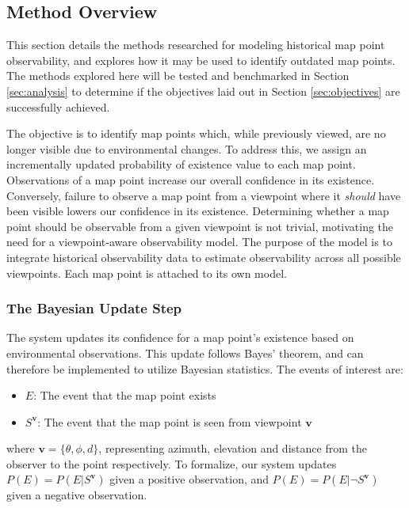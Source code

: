 \subsection{Method Overview}

This section details the methods researched for modeling historical map point observability, and explores how it may be used to identify outdated map points. The methods explored here will be tested and benchmarked in Section \ref{sec:analysis} to determine if the objectives laid out in Section \ref{sec:objectives} are successfully achieved.

The objective is to identify map points which, while previously viewed, are no longer visible due to environmental changes. To address this, we assign an incrementally updated probability of existence value to each map point. Observations of a map point increase our overall confidence in its existence. Conversely, failure to observe a map point from a viewpoint where it \textit{should} have been visible lowers our confidence in its existence. Determining whether a map point should be observable from a given viewpoint is not trivial, motivating the need for a viewpoint-aware observability model. The purpose of the model is to integrate historical observability data to estimate observability across all possible viewpoints. Each map point is attached to its own model.

\subsubsection{The Bayesian Update Step}

The system updates its confidence for a map point's existence based on environmental observations. This update follows Bayes' theorem, and can therefore be implemented to utilize Bayesian statistics. The events of interest are:
\begin{itemize}
    \item $E$: The event that the map point exists
    \item $S^{\boldsymbol{v}}$: The event that the map point is seen from viewpoint $\boldsymbol{v}$
\end{itemize}

where $\boldsymbol{v} = \{\theta,\phi,d\}$, representing azimuth, elevation and distance from the observer to the point respectively. To formalize, our system updates $P(E) = P(E|S^{\boldsymbol{v}})$ given a positive observation, and $P(E) = P(E|\neg S^{\boldsymbol{v}})$ given a negative observation.


